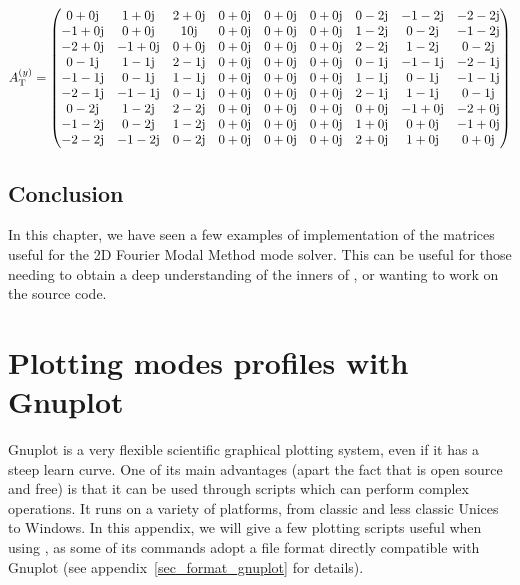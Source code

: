 {\footnotesize
\begin{equation}
A^{(y)}_\mathrm{T}=
\begin{pmatrix}
    0 +0\mathrm{j}&    1+ 0\mathrm{j}&    2 +0\mathrm{j}&     0 +0\mathrm{j}&    0+ 0\mathrm{j}&    0 +0\mathrm{j}&    0 -2\mathrm{j}&   -1 -2\mathrm{j}&   -2 -2\mathrm{j}\\ 
    -1 +0\mathrm{j}&    0 +0\mathrm{j}&    1 0\mathrm{j}&     0 +0\mathrm{j}&     0 +0\mathrm{j}&    0 +0\mathrm{j}&    1 -2\mathrm{j}&    0 -2\mathrm{j}&   -1 -2\mathrm{j}\\ 
    -2 +0\mathrm{j}&    -1 +0\mathrm{j}&    0 +0\mathrm{j}&     0 +0\mathrm{j}&     0 +0\mathrm{j}&     0 +0\mathrm{j}&    2 -2\mathrm{j}&    1 -2\mathrm{j}&    0 -2\mathrm{j}\\ 
   0 -1\mathrm{j}&    1 -1\mathrm{j}&    2 -1\mathrm{j}&     0 +0\mathrm{j}&    0 +0\mathrm{j}&    0 +0\mathrm{j}&    0 -1\mathrm{j}&   -1 -1\mathrm{j}&   -2 -1\mathrm{j}\\ 
   -1 -1\mathrm{j}&   0 -1\mathrm{j}&    1 -1\mathrm{j}&     0 +0\mathrm{j}&     0 +0\mathrm{j}&    0 +0\mathrm{j}&    1 -1\mathrm{j}&    0 -1\mathrm{j}&   -1 -1\mathrm{j}\\ 
   -2 -1\mathrm{j}&   -1 -1\mathrm{j}&   0 -1\mathrm{j}&     0 +0\mathrm{j}&     0 +0\mathrm{j}&     0 +0\mathrm{j}&    2 -1\mathrm{j}&    1 -1\mathrm{j}&    0 -1\mathrm{j}\\ 
   0 -2\mathrm{j}&    1 -2\mathrm{j}&    2 -2\mathrm{j}&     0 +0\mathrm{j}&    0 +0\mathrm{j}&    0 +0\mathrm{j}&     0 +0\mathrm{j}&    -1 +0\mathrm{j}&    -2 +0\mathrm{j}\\ 
   -1 -2\mathrm{j}&   0 -2\mathrm{j}&    1 -2\mathrm{j}&     0 +0\mathrm{j}&     0 +0\mathrm{j}&    0 +0\mathrm{j}&     1 +0\mathrm{j}&     0 +0\mathrm{j}&    -1 +0\mathrm{j}\\ 
   -2 -2\mathrm{j}&   -1 -2\mathrm{j}&   0 -2\mathrm{j}&     0 +0\mathrm{j}&     0 +0\mathrm{j}&     0 +0\mathrm{j}&     2 +0\mathrm{j}&     1 +0\mathrm{j}&     0 +0\mathrm{j}
\end{pmatrix}
\end{equation}}
\section{Conclusion}
In this chapter, we have seen a few examples of implementation of the matrices useful for the 2D Fourier Modal Method mode solver. This can be useful for those needing to obtain a deep understanding of the inners of \afmm , or wanting to work on the source code.

\chapter{Plotting modes profiles with Gnuplot}
\label{chap_gnuplot}
\textsf{Gnuplot\cite{gnuplot_site} is a very flexible scientific graphical plotting
system, even if it has a steep learn curve. One of its main advantages (apart the fact that is open source and free) is that it can be used through scripts which can perform complex operations. It runs on a variety of platforms, from classic and less classic Unices to Windows. 
In this appendix, we will give a few plotting scripts useful when using \afmm , as some of its commands adopt a file format directly compatible with Gnuplot (see appendix~\ref{sec_format_gnuplot} for details).}

